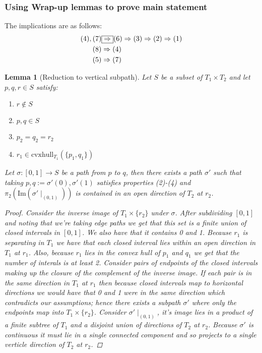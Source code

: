 \documentclass{article}
\theoremstyle{mystyle}
\newtheorem{lem}{Lemma}[section]
\theoremstyle{remark}
\begin{document}
\subsubsection{Using Wrap-up lemmas to prove main statement}
The implications are as follows:
\begin{alignat}{3}
    (4),(7) &\fbox{\(\label{eqn:filling}\Rightarrow\)}  (6) \Rightarrow (3) \Rightarrow (2)\Rightarrow (1) \\
    (8) &\Rightarrow (4)\\
    (5) &\Rightarrow (7)
\end{alignat}
\begin{lem}
    [Reduction to vertical subpath]
    \label{lem:verticalsubpath} 
    Let \(S\) be a subset of \(T_{1} \times T_{2}\) and let \(p,q,r \in S\) satisfy: 
    \begin{enumerate}
        \item \(r \not\in S\) 
        \item \(p,q \in S\) 
        \item \(p_{2} = q_{2} = r_{2}\) 
        \item \(r_{1} \in \text{cvxhull}_{T_{1}} (\{p_{1}, q_{1} \} )\) 
    \end{enumerate}
    Let \(\sigma : [0,1] \to S\) be a path from \(p\) to \(q\), then there exists a path \(\sigma '\) such that taking \(p,q:= \sigma '(0), \sigma '(1)\) satisfies properties (2)-(4) and \(\pi_{2} (\text{Im}( \sigma '\mid_{(0,1)} ))\) is contained in an open direction of \(T_{2}\) at \(r_{2}\).
    \begin{proof}
        Consider the inverse image of \(T_{1} \times \{r_{2}\} \) under \(\sigma\). After subdividing \([0,1]\) and noting that we're taking edge paths we get that this set is a finite union of closed intervals in \([0,1]\). We also have that it contains 0 and 1. Because \(r_{1}\) is separating in \(T_{1}\) we have that each closed interval lies within an open direction in \(T_{1}\) at \(r_{1}\). Also, because \(r_{1}\) lies in the convex hull of \(p_{1}\) and \(q_{1}\) we get that the number of interals is at least 2. Consider pairs of endpoints of the closed intervals making up the closure of the complement of the inverse image. If each pair is in the same direction in \(T_{1}\) at \(r_{1}\) then because closed intervals map to horizontal directions we would have that 0 and 1 were in the same direction which contradicts our assumptions; hence there exists a subpath \(\sigma '\) where only the endpoints map into \(T_{1} \times \{r_{2}\}\). Consider \(\sigma ' \mid_{(0,1)}\), it's image lies in a product of a finite subtree of \(T_{1}\) and a disjoint union of directions of \(T_{2}\) at \(r_{2}\). Because \(\sigma '\) is continuous it must lie in a single connected component and so projects to a single verticle direction of \(T_{2}\) at \(r_{2}\).

    \end{proof}
\end{lem}
\end{document}
